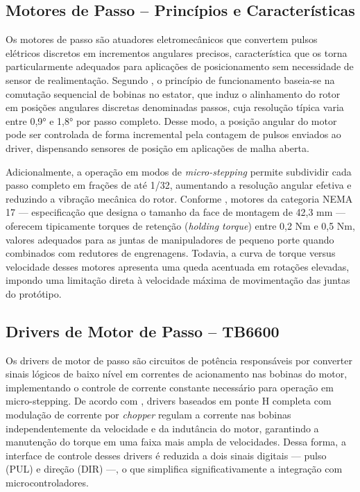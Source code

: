 \subsection{Motores de Passo -- Princípios e Características}

Os motores de passo são atuadores eletromecânicos que convertem pulsos elétricos discretos em incrementos angulares precisos, característica que os torna particularmente adequados para aplicações de posicionamento sem necessidade de sensor de realimentação. Segundo , o princípio de funcionamento baseia-se na comutação sequencial de bobinas no estator, que induz o alinhamento do rotor em posições angulares discretas denominadas passos, cuja resolução típica varia entre 0,9° e 1,8° por passo completo. Desse modo, a posição angular do motor pode ser controlada de forma incremental pela contagem de pulsos enviados ao driver, dispensando sensores de posição em aplicações de malha aberta.

Adicionalmente, a operação em modos de \textit{micro-stepping} permite subdividir cada passo completo em frações de até 1/32, aumentando a resolução angular efetiva e reduzindo a vibração mecânica do rotor. Conforme , motores da categoria NEMA 17 — especificação que designa o tamanho da face de montagem de 42,3 mm — oferecem tipicamente torques de retenção (\textit{holding torque}) entre 0,2 Nm e 0,5 Nm, valores adequados para as juntas de manipuladores de pequeno porte quando combinados com redutores de engrenagens. Todavia, a curva de torque versus velocidade desses motores apresenta uma queda acentuada em rotações elevadas, impondo uma limitação direta à velocidade máxima de movimentação das juntas do protótipo.

\subsection{Drivers de Motor de Passo -- TB6600}

Os drivers de motor de passo são circuitos de potência responsáveis por converter sinais lógicos de baixo nível em correntes de acionamento nas bobinas do motor, implementando o controle de corrente constante necessário para operação em micro-stepping. De acordo com , drivers baseados em ponte H completa com modulação de corrente por \textit{chopper} regulam a corrente nas bobinas independentemente da velocidade e da indutância do motor, garantindo a manutenção do torque em uma faixa mais ampla de velocidades. Dessa forma, a interface de controle desses drivers é reduzida a dois sinais digitais — pulso (PUL) e direção (DIR) —, o que simplifica significativamente a integração com microcontroladores.

